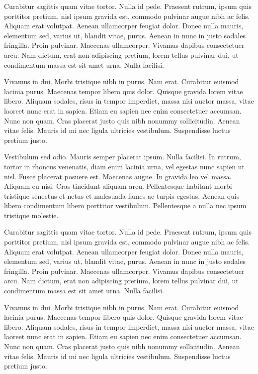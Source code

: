 Curabitur sagittis quam vitae tortor. Nulla id pede. Praesent rutrum, ipsum quis porttitor pretium, nisl ipsum gravida est, commodo pulvinar augue nibh ac felis. Aliquam erat volutpat. Aenean ullamcorper feugiat dolor. Donec nulla mauris, elementum sed, varius ut, blandit vitae, purus. Aenean in nunc in justo sodales fringilla. Proin pulvinar. Maecenas ullamcorper. Vivamus dapibus consectetuer arcu. Nam dictum, erat non adipiscing pretium, lorem tellus pulvinar dui, ut condimentum massa est sit amet urna. Nulla facilisi.

Vivamus in dui. Morbi tristique nibh in purus. Nam erat. Curabitur euismod lacinia purus. Maecenas tempor libero quis dolor. Quisque gravida lorem vitae libero. Aliquam sodales, risus in tempor imperdiet, massa nisi auctor massa, vitae laoreet nunc erat in sapien. Etiam eu sapien nec enim consectetuer accumsan. Nunc non quam. Cras placerat justo quis nibh nonummy sollicitudin. Aenean vitae felis. Mauris id mi nec ligula ultricies vestibulum. Suspendisse luctus pretium justo. 

Vestibulum sed odio. Mauris semper placerat ipsum. Nulla facilisi. In rutrum, tortor in rhoncus venenatis, diam enim lacinia urna, vel egestas nunc sapien ut nisl. Fusce placerat posuere est. Maecenas augue. In gravida leo vel massa. Aliquam eu nisi. Cras tincidunt aliquam arcu. Pellentesque habitant morbi tristique senectus et netus et malesuada fames ac turpis egestas. Aenean quis libero condimentum libero porttitor vestibulum. Pellentesque a nulla nec ipsum tristique molestie.

Curabitur sagittis quam vitae tortor. Nulla id pede. Praesent rutrum, ipsum quis porttitor pretium, nisl ipsum gravida est, commodo pulvinar augue nibh ac felis. Aliquam erat volutpat. Aenean ullamcorper feugiat dolor. Donec nulla mauris, elementum sed, varius ut, blandit vitae, purus. Aenean in nunc in justo sodales fringilla. Proin pulvinar. Maecenas ullamcorper. Vivamus dapibus consectetuer arcu. Nam dictum, erat non adipiscing pretium, lorem tellus pulvinar dui, ut condimentum massa est sit amet urna. Nulla facilisi.

Vivamus in dui. Morbi tristique nibh in purus. Nam erat. Curabitur euismod lacinia purus. Maecenas tempor libero quis dolor. Quisque gravida lorem vitae libero. Aliquam sodales, risus in tempor imperdiet, massa nisi auctor massa, vitae laoreet nunc erat in sapien. Etiam eu sapien nec enim consectetuer accumsan. Nunc non quam. Cras placerat justo quis nibh nonummy sollicitudin. Aenean vitae felis. Mauris id mi nec ligula ultricies vestibulum. Suspendisse luctus pretium justo. 

